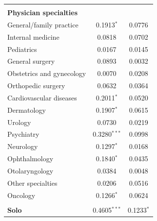 \documentclass[12pt]{report}
\begin{document}
{\begin{center}
\begin{longtable}{lSS[table-format = 0.4]}
                                       &                          &                           \\
\textbf{Physician specialties}         &                          &                           \\
General/family practice                & 0.1913$^{*}$               & 0.0776                    \\
Internal medicine                      & 0.0818                   & 0.0702                    \\
Pediatrics                             & 0.0167                   & 0.0145                    \\
General surgery                        & 0.0893                   & 0.0032                    \\
Obstetrics and gynecology              & 0.0070                   & 0.0208                    \\
Orthopedic surgery                     & 0.0632                   & 0.0364                    \\
Cardiovascular diseases                & 0.2011$^{*}$               & 0.0520                    \\
Dermatology                            & 0.1907$^{*}$               & 0.0615                    \\
Urology                                & 0.0730                   & 0.0219                    \\
Psychiatry                             & 0.3280$^{***}$               & 0.0998                    \\
Neurology                              & 0.1297$^{*}$               & 0.0168                    \\
Ophthalmology                          & 0.1840$^{*}$               & 0.0435                    \\
Otolaryngology                         & 0.0384                   & 0.0048                    \\
Other specialties                      & 0.0206                   & 0.0516                    \\
Oncology                               & 0.1266$^{*}$               & 0.0624                    \\
                                       &                          &                           \\
\textbf{Solo}                                   & 0.4605$^{***}$               & 0.1233$^{*}$                \\

\end{longtable}
\end{center}}
\end{document}
